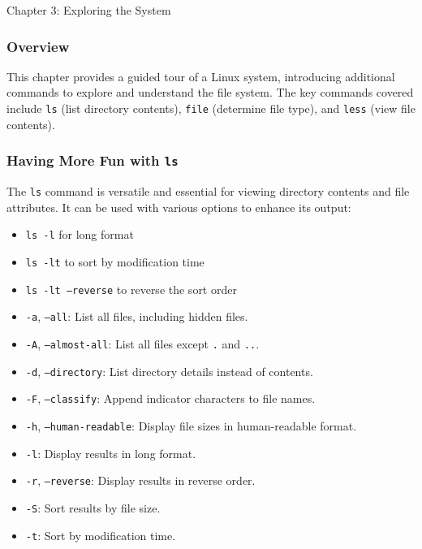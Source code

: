\begin{notes}{Chapter 3: Exploring the System}
    \subsubsection*{Overview}

    This chapter provides a guided tour of a Linux system, introducing additional commands to explore and understand the file system. The key commands covered include \texttt{ls} (list directory contents), 
    \texttt{file} (determine file type), and \texttt{less} (view file contents).

    \subsubsection*{Having More Fun with \texttt{ls}}

    The \texttt{ls} command is versatile and essential for viewing directory contents and file attributes. It can be used with various options to enhance its output:
    \begin{itemize}
        \item \texttt{ls -l} for long format
        \item \texttt{ls -lt} to sort by modification time
        \item \texttt{ls -lt --reverse} to reverse the sort order
    \end{itemize}

    \begin{highlight}
    \begin{itemize}
        \item \texttt{-a}, \texttt{--all}: List all files, including hidden files.
        \item \texttt{-A}, \texttt{--almost-all}: List all files except \texttt{.} and \texttt{..}.
        \item \texttt{-d}, \texttt{--directory}: List directory details instead of contents.
        \item \texttt{-F}, \texttt{--classify}: Append indicator characters to file names.
        \item \texttt{-h}, \texttt{--human-readable}: Display file sizes in human-readable format.
        \item \texttt{-l}: Display results in long format.
        \item \texttt{-r}, \texttt{--reverse}: Display results in reverse order.
        \item \texttt{-S}: Sort results by file size.
        \item \texttt{-t}: Sort by modification time.
    \end{itemize}
    \end{highlight}


\end{notes}
